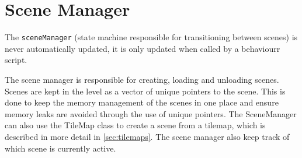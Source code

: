 \section{Scene Manager}
\label{sec:sceneManager}
The \texttt{sceneManager} (state machine responsible for transitioning between scenes) is never automatically updated, it is only updated when called by a behaviourr script.

\noindent The scene manager is responsible for creating, loading and unloading scenes.
Scenes are kept in the level as a vector of unique pointers to the scene.
This is done to keep the memory management of the scenes in one place and ensure memory leaks are avoided through the use of unique pointers.
The SceneManager can also use the TileMap class to create a scene from a tilemap, which is described in more detail in \autoref{sec:tilemaps}.
The scene manager also keep track of which scene is currently active.